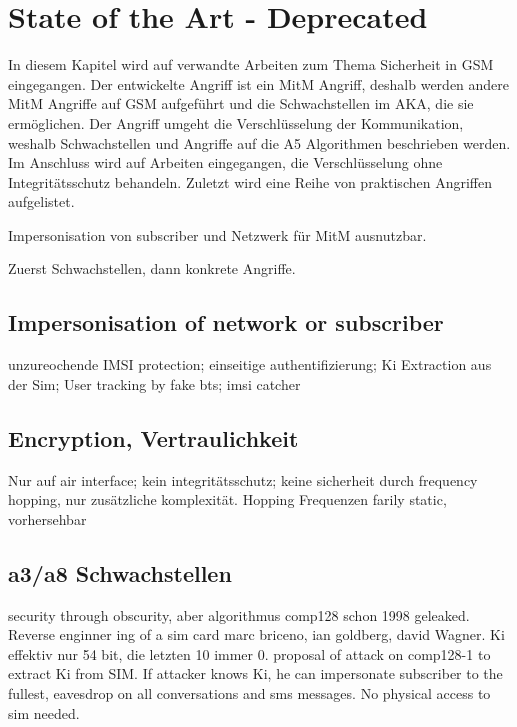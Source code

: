 
\chapter{State of the Art - Deprecated}
In diesem Kapitel wird auf verwandte Arbeiten zum Thema Sicherheit in \ac{GSM} eingegangen. Der entwickelte Angriff ist ein \ac{MitM} Angriff, deshalb werden andere \ac{MitM} Angriffe auf \ac{GSM} aufgeführt und die Schwachstellen im \ac{AKA}, die sie ermöglichen. Der Angriff umgeht die Verschlüsselung der Kommunikation, weshalb Schwachstellen und Angriffe auf die A5 Algorithmen beschrieben werden. Im Anschluss wird auf Arbeiten eingegangen, die Verschlüsselung ohne Integritätsschutz behandeln. Zuletzt wird eine Reihe von praktischen Angriffen aufgelistet.

Impersonisation von subscriber und Netzwerk für MitM ausnutzbar.

Zuerst Schwachstellen, dann konkrete Angriffe.

\section{Impersonisation of network or subscriber}
unzureochende IMSI protection;
einseitige authentifizierung;
Ki Extraction aus der Sim;
User tracking by fake bts; imsi catcher
\section{Encryption, Vertraulichkeit}
Nur auf air interface;
kein integritätsschutz;
keine sicherheit durch frequency hopping, nur zusätzliche komplexität. Hopping Frequenzen farily static, vorhersehbar

\section{a3/a8 Schwachstellen}
security through obscurity, aber algorithmus comp128 schon 1998 geleaked. Reverse enginner ing of a sim card marc briceno, ian goldberg, david Wagner. Ki effektiv nur 54 bit, die letzten 10 immer 0. proposal of attack on comp128-1 to extract Ki from SIM. If attacker knows Ki, he can impersonate subscriber to the fullest, eavesdrop on all conversations and sms messages. No physical access to sim needed. 

